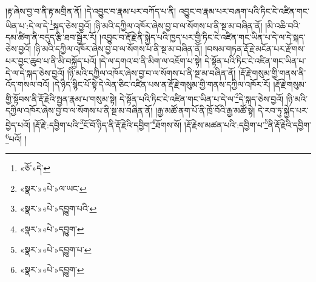 །རྟ་ཞེས་བྱ་བ་ནི་རྟ་མགྲིན་ནོ། །དེ་འབྱུང་བ་རྣམ་པར་བཀོད་པ་ནི། འབྱུང་བ་རྣམ་པར་བཞག་པའི་ཏིང་ངེ་འཛིན་གང་ཡིན་པ་:དེ་ལ་དེ་\footnote{«ཅོ་»དེ་}སྐད་ཅེས་བྱའོ། །ཉི་མའི་དཀྱིལ་འཁོར་ཞེས་བྱ་བ་ལ་སོགས་པ་ནི་སྔ་མ་བཞིན་ནོ། །མི་འཆི་བའི་དམ་ཚིག་ནི་བདུད་རྩི་ཐབ་སྦྱོར་རོ། །འབྱུང་བ་རྡོ་རྗེ་ནི་སྐྱེད་པའི་ཁྱད་པར་གྱི་ཏིང་ངེ་འཛིན་གང་ཡིན་པ་དེ་ལ་དེ་སྐད་ཅེས་བྱའོ། །ཉི་མའི་དཀྱིལ་འཁོར་ཞེས་བྱ་བ་ལ་སོགས་པ་ནི་སྔ་མ་བཞིན་ནོ། །བསམ་གཏན་རྡོ་རྗེ་མངོན་པར་རྫོགས་པར་བྱང་ཆུབ་པ་ནི་མི་བསྐྱོད་པའོ། །དེ་ལ་དགའ་བ་ནི་མིག་ལ་འཇོག་པ་སྟེ། དེ་སྟོན་པའི་ཏིང་ངེ་འཛིན་གང་ཡིན་པ་དེ་ལ་དེ་སྐད་ཅེས་བྱའོ། །ཉི་མའི་དཀྱིལ་འཁོར་ཞེས་བྱ་བ་ལ་སོགས་པ་ནི་སྔ་མ་བཞིན་ནོ། །རྡོ་རྗེ་གསུམ་གྱི་གནས་ནི་འོད་གསལ་བའོ། །དེ་ཉིད་སྙིང་པོ་སྟེ་དེ་ལེན་ཅིང་འཛིན་པས་ན་རྡོ་རྗེ་གསུམ་གྱི་གནས་དཀྱིལ་འཁོར་རོ། །རྡོ་རྗེ་གསུམ་གྱི་སྟོབས་ནི་རྡོ་རྗེའི་སྤྱན་རྣམ་པ་གསུམ་སྟེ། དེ་སྟོན་པའི་ཏིང་ངེ་འཛིན་གང་ཡིན་པ་དེ་ལ་\footnote{«སྣར་»«པེ་»ལ་ཡང་}དེ་སྐད་ཅེས་བྱའོ། །ཉི་མའི་དཀྱིལ་འཁོར་ཞེས་བྱ་བ་ལ་སོགས་པ་ནི་སྔ་མ་བཞིན་ནོ། །རྒྱ་མཚོ་ནག་པོ་ནི་ཁྲོ་བོའི་རྒྱ་མཚོ་སྟེ། དེ་རབ་ཏུ་སྐྱེད་པར་བྱེད་པའོ། །རྡོ་རྗེ་:དབྱིག་པའི་\footnote{«སྣར་»«པེ་»དབྱུག་པའི་}ངོ་བོ་ཉིད་ནི་རྡོ་རྗེའི་དབྱིག་\footnote{«སྣར་»«པེ་»དབྱུག་}ཐོགས་སོ། །རྡོ་རྗེས་མཚན་པའི་:དབྱིག་པ་\footnote{«སྣར་»«པེ་»དབྱུག་པ་}ནི་རྡོ་རྗེའི་དབྱིག་\footnote{«སྣར་»«པེ་»དབྱུག་}པའོ། །
